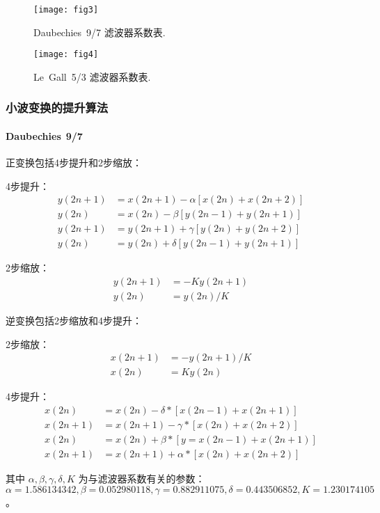 \begin{figure}[H]
	\centering
	\texttt{[image: fig3]}
	\caption{Daubechies 9/7 滤波器系数表.}
	\label{fig3}
\end{figure}

\begin{figure}[H]
	\centering
	\texttt{[image: fig4]}
	\caption{Le Gall 5/3 滤波器系数表.}
	\label{fig4}
\end{figure}

\subsubsection{小波变换的提升算法}
\paragraph{Daubechies 9/7} 正变换包括4步提升和2步缩放：\par
4步提升：
\[
\begin{aligned}
y(2n+1)&=x(2n+1)-\alpha[x(2n)+x(2n+2)]\\
y(2n)&=x(2n)-\beta[y(2n-1)+y(2n+1)]\\
y(2n+1)&=y(2n+1)+\gamma[y(2n)+y(2n+2)]\\
y(2n)&=y(2n)+\delta[y(2n-1)+y(2n+1)]
\end{aligned}
\]\par
2步缩放：
\[
\begin{aligned}
y(2n+1)&=-Ky(2n+1)\\
y(2n)&=y(2n)/K
\end{aligned}
\]\par

逆变换包括2步缩放和4步提升：\par
2步缩放：
\[
\begin{aligned}
x(2n+1)&=-y(2n+1)/K\\
x(2n)&=Ky(2n)
\end{aligned}
\]\par
4步提升：
\[
\begin{aligned}
x(2n)&=x(2n)-\delta*[x(2n-1)+x(2n+1)]\\
x(2n+1)&=x(2n+1)-\gamma*[x(2n)+x(2n+2)]\\
x(2n)&=x(2n)+\beta*[y=x(2n-1)+x(2n+1)]\\
x(2n+1)&=x(2n+1)+\alpha*[x(2n)+x(2n+2)]
\end{aligned}
\]\par


其中 $\alpha,\beta,\gamma,\delta,K$ 为与滤波器系数有关的参数：$\alpha=1.586134342,\beta=0.052980118,\gamma=0.882911075,\delta=0.443506852,K=1.230174105$。

